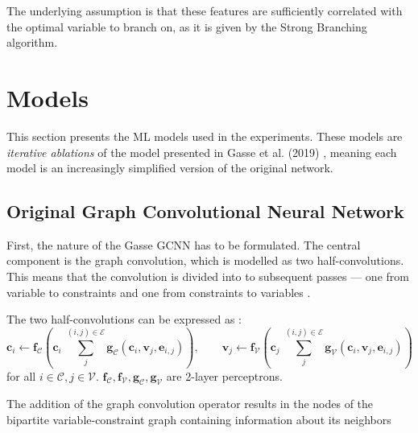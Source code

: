 %


The underlying assumption is that these features are sufficiently correlated with the optimal variable to branch on, as it is given by the Strong Branching algorithm.



\section{Models}\label{sec:models}

This section presents the \gls{ML} models used in the experiments. These models are \textit{iterative ablations} of the model presented in Gasse et al. (2019) \cite{gasse2019exact}, meaning each model is an increasingly simplified version of the original network. 


\subsection{Original Graph Convolutional Neural Network}\label{ssec:models_gcnn}

First, the nature of the Gasse GCNN has to be formulated. The central component is the graph convolution, which is modelled as two half-convolutions. This means that the convolution is divided into to subsequent passes --- one from variable to constraints and one from constraints to variables \cite{gasse2019exact}. 

The two half-convolutions can be expressed as \cite{gasse2019exact}:
\begin{equation}
    \mathbf{c}_i \leftarrow \mathbf{f}_{\mathcal{C}}\left( \mathbf{c}_i \; \sum_j^{(i,j) \in \mathcal{E}}\mathbf{g}_{\mathcal{C}} (\mathbf{c}_i, \mathbf{v}_j, \mathbf{e}_{i,j})\right), \qquad
    \mathbf{v}_j \leftarrow \mathbf{f}_{\mathcal{V}}\left( \mathbf{c}_j \; \sum_j^{(i,j) \in \mathcal{E}}\mathbf{g}_{\mathcal{V}} (\mathbf{c}_i, \mathbf{v}_j, \mathbf{e}_{i,j})\right)
\end{equation}
for all $i \in \mathcal{C}, j \in \mathcal{V}$. $\mathbf{f}_{\mathcal{C}},\mathbf{f}_{\mathcal{V}},\mathbf{g}_{\mathcal{C}},\mathbf{g}_{\mathcal{V}}$ are 2-layer perceptrons. 

The addition of the graph convolution operator results in the nodes of the bipartite variable-constraint graph containing information about its neighbors 

